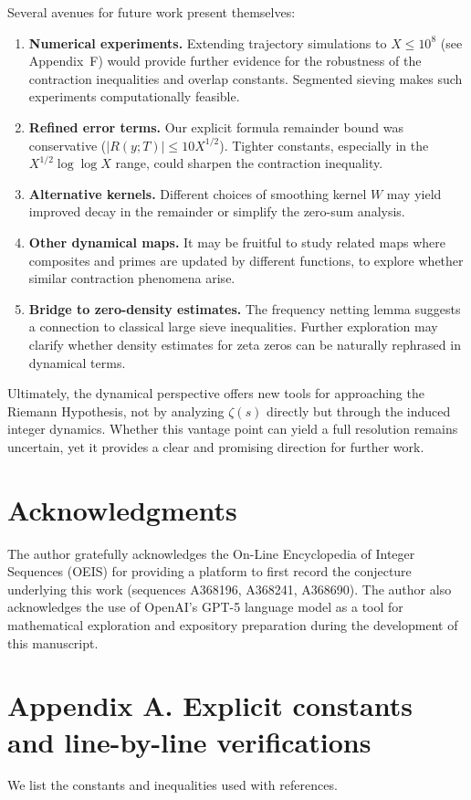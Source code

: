 \documentclass[11pt]{article}
\theoremstyle{plain}
\theoremstyle{definition}
\theoremstyle{remark}
\begin{document}
Several avenues for future work present themselves:
\begin{enumerate}
\item \textbf{Numerical experiments.} Extending trajectory simulations to $X\leq 10^8$ (see Appendix~F) would provide further evidence for the robustness of the contraction inequalities and overlap constants. Segmented sieving makes such experiments computationally feasible.
\item \textbf{Refined error terms.} Our explicit formula remainder bound was conservative ($|R(y;T)|\leq 10X^{1/2}$). Tighter constants, especially in the $X^{1/2}\log\log X$ range, could sharpen the contraction inequality.
\item \textbf{Alternative kernels.} Different choices of smoothing kernel $W$ may yield improved decay in the remainder or simplify the zero-sum analysis.
\item \textbf{Other dynamical maps.} It may be fruitful to study related maps where composites and primes are updated by different functions, to explore whether similar contraction phenomena arise.
\item \textbf{Bridge to zero-density estimates.} The frequency netting lemma suggests a connection to classical large sieve inequalities. Further exploration may clarify whether density estimates for zeta zeros can be naturally rephrased in dynamical terms.
\end{enumerate}

Ultimately, the dynamical perspective offers new tools for approaching the Riemann Hypothesis,
not by analyzing $\zeta(s)$ directly but through the induced integer dynamics.
Whether this vantage point can yield a full resolution remains uncertain,
yet it provides a clear and promising direction for further work.

\section*{Acknowledgments}
The author gratefully acknowledges the On-Line Encyclopedia of Integer Sequences (OEIS) for providing a platform to first record the conjecture underlying this work (sequences A368196, A368241, A368690). The author also acknowledges the use of OpenAI’s GPT-5 language model as a tool for mathematical exploration and expository preparation during the development of this manuscript.

\appendix

\section*{Appendix A. Explicit constants and line-by-line verifications}\label{app:constants}
We list the constants and inequalities used with references.
\end{document}
